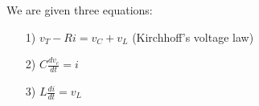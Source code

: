 \documentclass[preview]{standalone}
\begin{document}
\begin{center}
\raggedright
                We are given three equations: 
                \begin{enumerate}
                    \item[1)] $v_T - Ri = v_C + v_L$ (Kirchhoff’s voltage law)
                    \item[2)] $C\frac{dv_c}{dt} = i$
                    \item[3)] $L\frac{di}{dt} = v_L$
                \end{enumerate}
                \vspace{1em}
\end{center}
\end{document}
